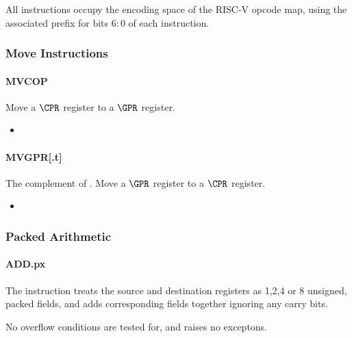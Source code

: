 All instructions occupy the \encspace encoding space of the RISC-V opcode
map, using the associated \encopcode prefix for bits $6:0$ of each 
instruction.

\subsubsection{Move Instructions}
\paragraph{MVCOP}

Move a $\CPR$ register to a $\GPR$ register.

\begin{itemize}
\item {}
\end{itemize}


\paragraph{MVGPR[.t]}

The complement of .
Move a $\GPR$ register to a $\CPR$ register.

\begin{itemize}
\item {}
\end{itemize}

\subsubsection{Packed Arithmetic}
\paragraph{ADD.px}

The instruction  treats the source and destination registers as
1,2,4 or 8 unsigned, packed fields, and adds corresponding fields together
ignoring any carry bits.

No overflow conditions are tested for, and  raises no exceptons.

